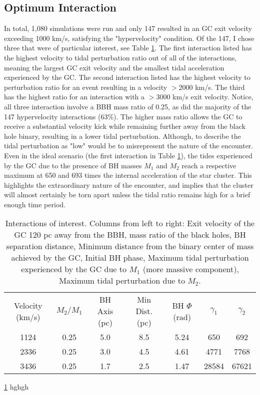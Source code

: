 \documentclass{aastex62}
\begin{document}
\subsection{Optimum Interaction}
In total, 1,080 simulations were run and only 147 resulted in an GC exit velocity exceeding 1000 km/s, satisfying the "hypervelocity" condition. Of the 147, I chose three that were of particular interest, see Table \ref{results}. The first interaction listed has the highest velocity to tidal perturbation ratio out of all of the interactions, meaning the largest GC exit velocity and the smallest tidal acceleration experienced by the GC. The second interaction listed has the highest velocity to perturbation ratio for an event resulting in a velocity $>$2000 km/s. The third has the highest ratio for an interaction with a $>$3000 km/s exit velocity. Notice, all three interaction involve a BBH mass ratio of 0.25, as did the majority of the 147 hypervelocity interactions (63$\%$). The higher mass ratio allows the GC to receive a substantial velocity kick while remaining further away from the black hole binary, resulting in a lower tidal perturbation. Although, to describe the tidal perturbation as "low" would be to misrepresent the nature of the encounter. Even in the ideal scenario (the first interaction in Table \ref{results}), the tides experienced by the GC due to the presence of BH masses $M_{1}$ and $M_{2}$ reach a respective maximum at 650 and 693 times the internal acceleration of the star cluster. This highlights the extraordinary nature of the encounter, and implies that the cluster will almost certainly be torn apart unless the tidal ratio remains high for a brief enough time period.
\begin{table}
\centering
\caption{Interactions of interest. Columns from left to right: Exit velocity of the GC 120 pc away from the BBH, mass ratio of the black holes, BH separation distance, Minimum distance from the binary center of mass achieved by the GC, Initial BH phase, Maximum tidal perturbation experienced by the GC due to $M_{1}$ (more massive component), Maximum tidal perturbation due to $M_{2}$. \label{results}}

\begin{tabular}{ccccccc}
\hline \hline
Velocity (km/s) & $M_{2}/M_{1}$ & BH Axis (pc) & Min Dist. (pc) & BH $\Phi$ (rad) & $\gamma_{1}$ & $\gamma_{2}$  \\
1124 & 0.25 & 5.0 & 8.5 & 5.24 & 650 & 692 \\
2336 & 0.25 & 3.0 & 4.5 & 4.61 & 4771 & 7768 \\
3436 & 0.25 & 1.7 & 2.5 & 1.47 & 28584 & 67621 \\
\end{tabular}
\end{table}
\ref{results} hghgh
\end{document}
